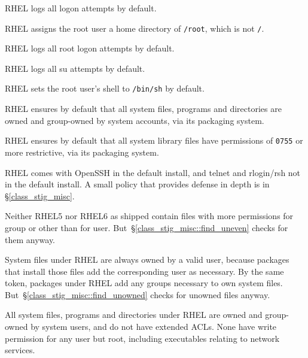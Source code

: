  RHEL logs all logon attempts by default.

 RHEL assigns the root user a home directory
of \verb!/root!, which is not \verb!/!.

 RHEL logs all root logon attempts by
default.

 RHEL logs all su attempts by default.

 RHEL sets the root user's shell to
\verb!/bin/sh! by default.

  RHEL ensures
by default that all system files, programs and directories are owned and
group-owned by system accounts, via its packaging system.

 RHEL ensures by default that all system
library files have permissions of \verb!0755! or more restrictive, via its
packaging system.

 RHEL comes with OpenSSH in the default
install, and telnet and rlogin/rsh not in the default install. A small
policy that provides defense in depth is in \S\ref{class_stig_misc}.

 Neither RHEL5 nor RHEL6 as
shipped contain files with more permissions for group or other than for
user. But~\S\ref{class_stig_misc::find_uneven} checks for them anyway.

System files under RHEL are always owned by a valid user, because packages
that install those files add the corresponding user as necessary. By the
same token, packages under RHEL add any groups necessary to own system
files. But~\S\ref{class_stig_misc::find_unowned} checks for unowned files
anyway.

All system files, programs and directories under RHEL are owned and
group-owned by system users, and do not have extended ACLs. None have
write permission for any user but root, including executables relating to
network services.

